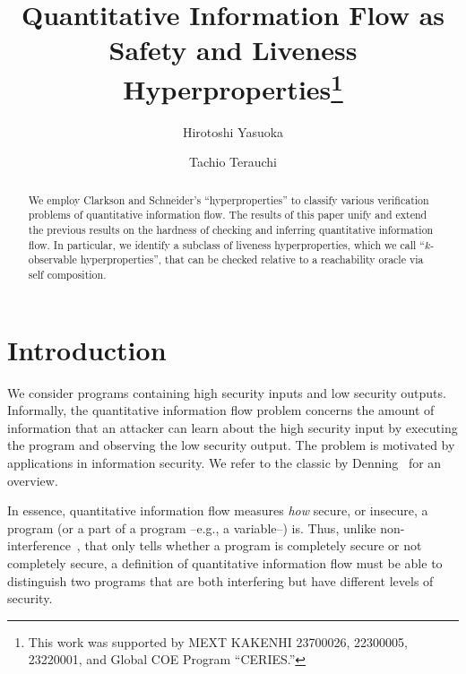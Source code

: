 \documentclass[]{eptcs}
\begin{document}
\title{Quantitative Information Flow as Safety and Liveness
  Hyperproperties\thanks{This work was supported by MEXT KAKENHI
    23700026, 22300005, 23220001, and Global COE Program ``CERIES.''}}


\author{Hirotoshi Yasuoka
\and
Tachio Terauchi
}


\def\titlerunning{Quantitative Information Flow as Safety and Liveness
  Hyperproperties}
\def\authorrunning{H. Yasuoka \& T. Terauchi}
\maketitle

\begin{abstract}
  We employ Clarkson and Schneider's ``hyperproperties'' to classify
  various verification problems of quantitative information flow.  The
  results of this paper unify and extend the previous results on the
  hardness of checking and inferring quantitative information flow.
  In particular, we identify a subclass of liveness hyperproperties,
  which we call ``$k$-observable hyperproperties'', that can be
  checked relative to a reachability oracle via self composition.
\end{abstract}

\section{Introduction}
\label{sec:introduction}

We consider programs containing high security inputs and low security
outputs.  Informally, the quantitative information flow problem
concerns the amount of information that an attacker can learn about
the high security input by executing the program and observing the low
security output.  The problem is motivated by applications in
information security.  We refer to the classic by
Denning~\cite{denning82} for an overview.

In essence, quantitative information flow measures {\em how} secure,
or insecure, a program (or a part of a program --e.g., a variable--)
is.  Thus, unlike
non-interference~\cite{DBLP:conf/sosp/Cohen77,goguen:sp1982}, that
only tells whether a program is completely secure or not completely
secure, a definition of quantitative information flow must be able to
distinguish two programs that are both interfering but have different
levels of security.
\end{document}

